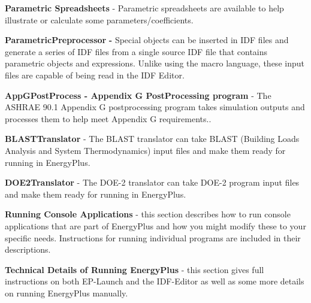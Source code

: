 \textbf{Parametric Spreadsheets} - Parametric spreadsheets are available to help illustrate or calculate some parameters/coefficients.

\textbf{ParametricPreprocessor} \textbf{-} Special objects can be inserted in IDF files and generate a series of IDF files from a single source IDF file that contains parametric objects and expressions. Unlike using the macro language, these input files are capable of being read in the IDF Editor.

\textbf{AppGPostProcess - Appendix G PostProcessing program} - The ASHRAE 90.1 Appendix G postprocessing program takes simulation outputs and processes them to help meet Appendix G requirements..

\textbf{BLASTTranslator} - The BLAST translator can take BLAST (Building Loads Analysis and System Thermodynamics) input files and make them ready for running in EnergyPlus.

\textbf{DOE2Translator} - The DOE-2 translator can take DOE-2 program input files and make them ready for running in EnergyPlus.

\textbf{Running Console Applications} - this section describes how to run console applications that are part of EnergyPlus and how you might modify these to your specific needs. Instructions for running individual programs are included in their descriptions.

\textbf{Technical Details of Running EnergyPlus} - this section gives full instructions on both EP-Launch and the IDF-Editor as well as some more details on running EnergyPlus manually.

